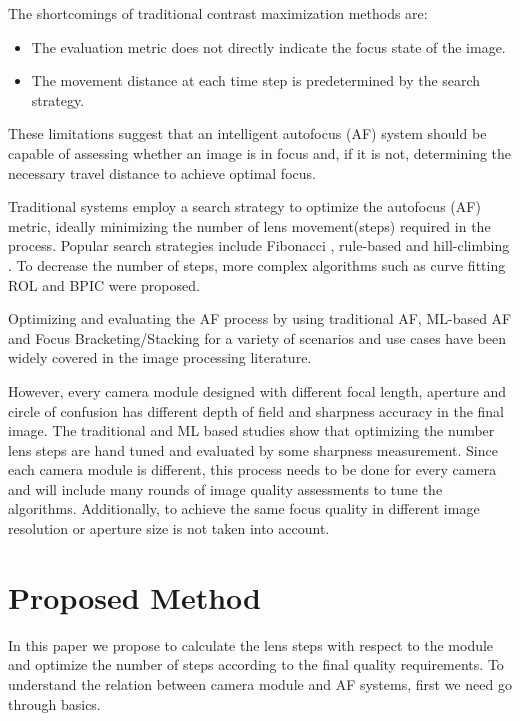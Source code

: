 \documentclass{article}
\begin{document}
The shortcomings of traditional contrast maximization methods are:
\begin{itemize}
    \item The evaluation metric does not directly indicate the focus state of the image.
    \item The movement distance at each time step is predetermined by the search strategy.
\end{itemize}

These limitations suggest that an intelligent autofocus (AF) system should be capable of assessing whether an image is in focus and, if it is not, determining the necessary travel distance to achieve optimal focus.

Traditional systems employ a search strategy to optimize the autofocus (AF) metric, ideally minimizing the number of lens movement(steps) required in the process. Popular search strategies include Fibonacci \cite{krotkov1988}, rule-based \cite{kehtarnavaz2003development} and hill-climbing \cite{he2003modified}. To decrease the number of steps, more complex algorithms such as curve fitting ROL \cite{yazdanfar2008simple} and BPIC \cite{wu2012bilateral} were proposed. 

Optimizing and evaluating the AF process by using traditional AF, ML-based AF and Focus Bracketing/Stacking \cite{wang2020intelligent} for a variety of scenarios and use cases have been widely covered in the image processing literature. 

However, every camera module designed with different focal length, aperture and circle of confusion has different depth of field and sharpness accuracy in the final image. The traditional and ML based studies show that optimizing the number lens steps are hand tuned and evaluated by some sharpness measurement. Since each camera module is different, this process needs to be done for every camera and will include many rounds of image quality assessments to tune the algorithms. Additionally, to achieve the same focus quality in different image resolution or aperture size is not taken into account. 

\section{Proposed Method}
\label{sec:proposed}

In this paper we propose to calculate the lens steps with respect to the module and optimize the number of steps according to the final quality requirements. 
To understand the relation between camera module and AF systems, first we need go through basics. 
\end{document}
